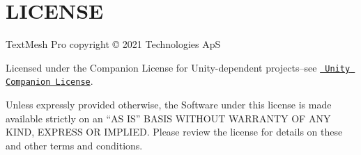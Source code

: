 \chapter{LICENSE}
\hypertarget{md__library_2_package_cache_2com_8unity_8textmeshpro_0d3_80_86_2_l_i_c_e_n_s_e}{}\label{md__library_2_package_cache_2com_8unity_8textmeshpro_0d3_80_86_2_l_i_c_e_n_s_e}
Text\+Mesh Pro copyright © 2021  Technologies ApS

Licensed under the  Companion License for Unity-\/dependent projects--see \href{http://www.unity3d.com/legal/licenses/Unity_Companion_License}{\texttt{ Unity Companion License}}.

Unless expressly provided otherwise, the Software under this license is made available strictly on an “\+AS IS” BASIS WITHOUT WARRANTY OF ANY KIND, EXPRESS OR IMPLIED. Please review the license for details on these and other terms and conditions. 